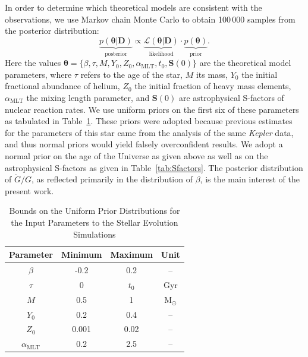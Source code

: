 \documentclass[twocolumn]{aastex63}
\newif\ifref
\newcommand{\mb}[1]{\ifref\textcolor{darkred}{#1}\else #1\fi}
\newif\ifreff
\newcommand{\mbb}[1]{\ifreff\textcolor{darkred}{#1}\else #1\fi}
\begin{document}
In order to determine which theoretical models are consistent with the observations, we use Markov chain Monte Carlo \citep[MCMC, e.g.,][]{2010CAMCS...5...65G} 
to obtain 100\,000 samples from the posterior distribution: 
\begin{equation}
    \underbrace{p(\boldsymbol\theta | \boldsymbol D)}_{\text{posterior}}
    \propto 
    \underbrace{\mathcal{L}(\boldsymbol\theta | \boldsymbol D)}_{\text{likelihood}} 
    \cdot 
    \underbrace{p(\boldsymbol \theta)}_{\text{prior}}.
\end{equation}
Here the values ${\boldsymbol\theta = \{ \beta}, \tau, M, Y_0, Z_0, \alpha_{\text{MLT}}, t_0,  \boldsymbol S(0) \}$ are the theoretical model parameters, where $\tau$ refers to the age of the star, $M$ its mass, $Y_0$ the initial fractional abundance of helium, $Z_0$ the initial fraction of heavy mass elements, $\alpha_{\text{MLT}}$ the mixing length parameter, and $\boldsymbol S(0)$ are astrophysical S-factors of nuclear reaction rates. 
We use uniform priors on the first six of these parameters as tabulated in Table~\ref{tab:priors}. 
\mbb{These priors were adopted because previous estimates for the parameters of this star came from the analysis of the same \emph{Kepler} data, and thus normal priors would yield falsely overconfident results.} 
We adopt a normal prior on the age of the Universe as given above as well as on the astrophysical S-factors as given in Table~\ref{tab:Sfactors}. 
\mb{The posterior distribution of $\dot G/G$, as reflected primarily in the distribution of $\beta$, is the main interest of the present work.} 

\begin{table}
    \centering
    \caption{Bounds on the Uniform Prior Distributions for the Input Parameters to the Stellar Evolution Simulations \label{tab:priors}}
    \begin{tabular}{c|ccc}\hline
        Parameter & Minimum & Maximum & Unit \\\hline\hline
        $\beta$ & -0.2 & 0.2 & -- \\
        $\tau$ & 0 & $t_0$ & Gyr \\
        $M$ & 0.5 & 1 & M$_\odot$ \\ 
        $Y_0$ & 0.2 & 0.4 & -- \\
        $Z_0$ & 0.001 & 0.02 & -- \\ 
        $\alpha_{\text{MLT}}$ & 0.2 & 2.5 & -- \\\hline
    \end{tabular}
\end{table}
\end{document}
